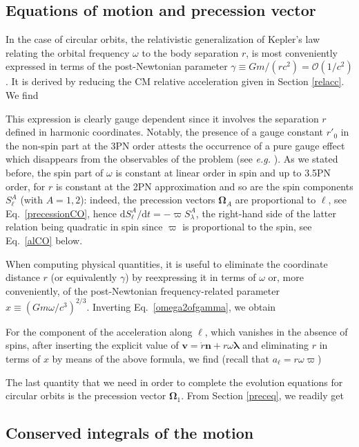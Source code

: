 \documentclass[
superscriptaddress,
preprint,
prd,tightenlines,showpacs,nofootinbib,
eqsecnum,
amsfonts,amsmath,amssymb]{revtex4-1}
\newcommand{\ud}{\mathrm{d}}
\begin{document}
\subsection{Equations of motion and precession vector}

In the case of circular orbits, the relativistic generalization of
Kepler's law relating the orbital frequency $\omega$ to the body
separation $r$, is most conveniently expressed in terms of the
post-Newtonian parameter $\gamma\equiv G m/(r
c^2)=\mathcal{O}(1/c^2)$. It is derived by reducing the CM relative
acceleration given in Section \ref{relacc}. We find
%

%
This expression is clearly gauge dependent since it involves the
separation $r$ defined in harmonic coordinates. Notably, the presence
of a gauge constant $r'_0$ in the non-spin part at the 3PN order
attests the occurrence of a pure gauge effect which disappears from
the observables of the problem (see \textit{e.g.}
\cite{Blanchet2006a}). As we stated before, the spin part of $\omega$
is constant at linear order in spin and up to 3.5PN order, for $r$ is
constant at the 2PN approximation and so are the spin components
$S_\ell^A$ (with $A=1,2$): indeed, the precession vectors
$\bm{\Omega}_{A}$ are proportional to $\bm{\ell}$, see
Eq.~\eqref{precessionCO}, hence $\ud S_\ell^A/\ud t = -\varpi
S_\lambda^A$, the right-hand side of the latter relation being
quadratic in spin since $\varpi$ is proportional to the spin,
  see Eq.~\eqref{alCO} below.

When computing physical quantities, it is useful to eliminate the
coordinate distance $r$ (or equivalently $\gamma$) by reexpressing it
in terms of $\omega$ or, more conveniently, of the post-Newtonian
frequency-related parameter $x\equiv (G m \omega/c^3)^{2/3}$.
Inverting Eq.~\eqref{omega2ofgamma}, we obtain
%

%
For the component of the acceleration along $\boldsymbol\ell$, which vanishes
in the absence of spins, after inserting the explicit value of
$\mathbf{v} = \dot{r} \mathbf{n}+ r \omega \bm{\lambda} $ and eliminating $r$
in terms of $x$ by means of the above formula, we find (recall that $a_{\ell}
= r\omega\varpi$)
%

%
The last quantity that we need in order to complete the evolution
equations for circular orbits is the precession vector
$\mathbf{\Omega}_1$. From Section \ref{preceq}, we readily get
%


\subsection{Conserved integrals of the motion}
\end{document}
